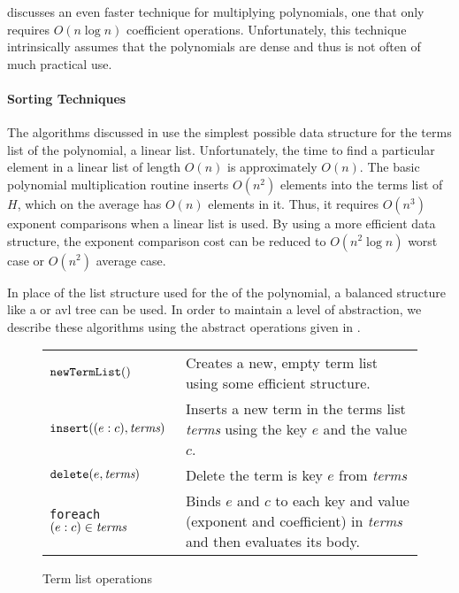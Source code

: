  discusses an even faster technique for
multiplying polynomials, one that only requires $O(n \log n)$
coefficient operations.  Unfortunately, this technique intrinsically
assumes that the polynomials are dense and thus is not often of much
practical use.

\paragraph{Sorting Techniques}

The algorithms discussed in  use the simplest
possible data structure for the terms list of the polynomial, a linear
list.  Unfortunately, the time to find a particular element in a
linear list of length $O(n)$ is approximately $O(n)$.  The basic
polynomial multiplication routine  inserts $O(n^2)$
elements into the terms list of $H$, which on the average has $O(n)$
elements in it.  Thus, it requires $O(n^3)$ exponent comparisons when
a linear list is used.  By using a more efficient data structure, the
exponent comparison cost can be reduced to $O(n^2 \log n)$ worst case
or $O(n^2)$ average case.

In place of the list structure used for the  of the
polynomial, a balanced structure like a  or {\sc avl}
tree can be used.  In order to maintain
a level of abstraction, we describe these algorithms using the
abstract operations given in .

\begin{figure}
\begin{center}
\begin{tabular}{lp{2.25in}}
$\mbox{\tt newTermList}()$ & Creates a new, empty term list using some
efficient structure.\\[4pt] 
$\mbox{\tt insert}((e : c), \mbox{\em terms})$& Inserts a new term in
the terms list {\em terms} using the key $e$ and the value $c$. \\[4pt]
$\mbox{\tt delete}(e, \mbox{\em terms})$& Delete the term is key $e$ from
{\em terms} \\[4pt]
{\tt foreach $(e : c) \in \mbox{\em terms}$} & Binds $e$ and $c$ to
each key and value (exponent and coefficient) in {\em terms} and then
evaluates its body. 
\end{tabular}
\end{center}
\caption{Term list operations\label{TermList:Fig}}
\end{figure}

